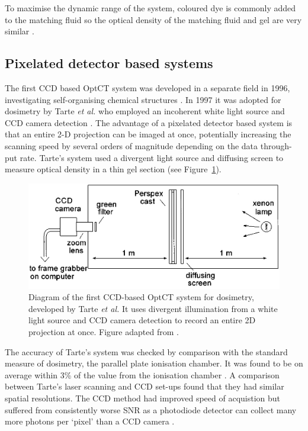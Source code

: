 \documentclass[12pt]{article}
\begin{document}
To maximise the dynamic range of the system, coloured dye is commonly added to the matching fluid so the optical density of the matching fluid and gel are very similar \cite{Krstajic:2006kna}. 




\subsection{Pixelated detector based systems}

The first CCD based OptCT system was developed in a separate field in 1996, investigating self-organising chemical structures \cite{Winfree:1996}.
In 1997 it was adopted for dosimetry by Tarte \textit{et al.} who employed an incoherent white light source and CCD camera detection \cite{Tarte:2007}. The advantage  of a pixelated detector based system  is that an entire 2-D projection can be imaged at once, potentially increasing the scanning speed by several  orders of magnitude depending on the data through-put rate. Tarte's system used a divergent light source and diffusing screen to measure optical density in a thin gel section (see Figure~\ref{fig:tarte_ccd_setup}). 

\begin{figure}[H]
\centering
\includegraphics[scale=0.4]{Tarte_1997_ccdsetup.jpg}
\caption{Diagram of the first CCD-based  OptCT system for dosimetry, developed by Tarte \textit{et al.} It uses  divergent illumination from a white light source and CCD camera detection to record an entire 2D projection at once.   Figure adapted from \cite{Tarte:2007}. }
\label{fig:tarte_ccd_setup}
\end{figure}


The accuracy of Tarte's system  was checked by comparison with the standard measure of dosimetry, the parallel plate ionisation chamber. It was found to be on average within 3\% of the value from the ionisation chamber \cite{Tarte:2007}. A comparison between Tarte's laser scanning and CCD set-ups found that they had similar spatial resolutions. The CCD method had improved speed of acquistion but suffered from consistently worse SNR as a photodiode detector can collect many more photons per `pixel' than a CCD camera \cite{Tarte:2007}.
\end{document}
